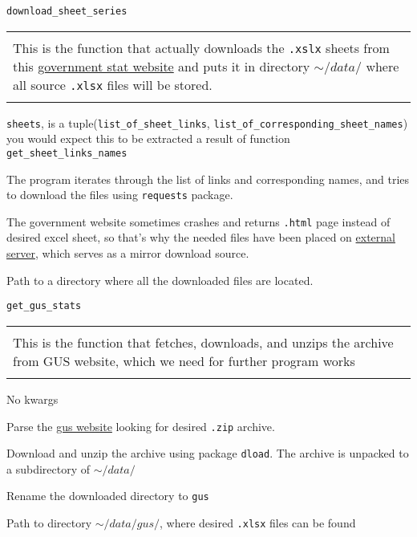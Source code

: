 \documentclass[12pt,a4paper]{article}
\newcommand{\code}[1]{\texttt{#1}}
\newenvironment{func}[1]
    {\begin{center}
    #1\\[1ex]
    \begin{tabular}{|p{0.9\textwidth}|}
    \hline\\
    }
    {
    \\\\\hline
    \end{tabular}
    \end{center}
    }
\begin{document}
\begin{func}{\texttt{download\_sheet\_series}}
This is the function that actually downloads the \code{.xslx} sheets from this \href{https://www.gov.pl/web/finanse/udzialy-za-2020-r}{government stat website} and puts it in directory $\sim/data/$ where all source \code{.xlsx} files will be stored.
\end{func}

\begin{details}{
\item \code{sheets}, is a tuple(\code{list\_of\_sheet\_links}, \code{list\_of\_corresponding\_sheet\_names}) you would expect this to be extracted a result of function \texttt{get\_sheet\_links\_names}
}{
\item The program iterates through the list of links and corresponding names, and tries to download the files using \code{requests} package.
\item The government website sometimes crashes and returns \code{.html} page instead of desired excel sheet, so that's why the needed files have been placed on \href{http://studenci.fuw.edu.pl/~kc427902/NPD_xlsx_mirror/}{external server}, which serves as a mirror download source.
}{
\item Path to a directory where all the downloaded files are located.
}
\end{details}

\begin{func}{\texttt{get\_gus\_stats}}
This is the function that fetches, downloads, and unzips the archive from GUS website, which we need for further program works
\end{func}

\begin{details}{
\item No kwargs
}{
\item Parse the \href{https://stat.gov.pl/obszary-tematyczne/ludnosc/ludnosc/ludnosc-stan-i-struktura-ludnosci-oraz-ruch-naturalny-w-przekroju-terytorialnym-stan-w-dniu-31-12-2020,6,29.html}{gus website} looking for desired \code{.zip} archive.
\item Download and unzip the archive using package \code{dload}. The archive is unpacked to a subdirectory of $\sim/data/$
\item Rename the downloaded directory to \code{gus}
}{
\item Path to directory $\sim/data/gus/$, where desired \code{.xlsx} files can be found
}
\end{details}
\end{document}
